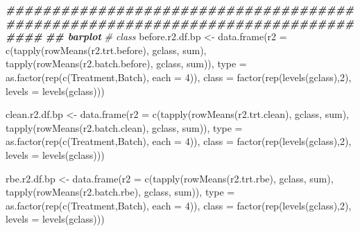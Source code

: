 \documentclass[
]{book}
\newenvironment{Shaded}{\begin{snugshade}}{\end{snugshade}}
\newcommand{\AttributeTok}[1]{\textcolor[rgb]{0.77,0.63,0.00}{#1}}
\newcommand{\CommentTok}[1]{\textcolor[rgb]{0.56,0.35,0.01}{\textit{#1}}}
\newcommand{\DecValTok}[1]{\textcolor[rgb]{0.00,0.00,0.81}{#1}}
\newcommand{\DocumentationTok}[1]{\textcolor[rgb]{0.56,0.35,0.01}{\textbf{\textit{#1}}}}
\newcommand{\FunctionTok}[1]{\textcolor[rgb]{0.00,0.00,0.00}{#1}}
\newcommand{\NormalTok}[1]{#1}
\newcommand{\OtherTok}[1]{\textcolor[rgb]{0.56,0.35,0.01}{#1}}
\newcommand{\StringTok}[1]{\textcolor[rgb]{0.31,0.60,0.02}{#1}}
\begin{document}
\begin{Shaded}
\begin{Highlighting}[]
\DocumentationTok{\#\#\#\#\#\#\#\#\#\#\#\#\#\#\#\#\#\#\#\#\#\#\#\#\#\#\#\#\#\#\#\#\#\#\#\#\#\#\#\#\#\#\#\#\#\#\#\#\#\#\#\#\#\#\#\#\#\#\#\#\#\#\#\#\#\#\#\#\#\#\#\#\#\#\#\#\#\#\#\#}
\DocumentationTok{\#\# barplot}
\CommentTok{\# class}
\NormalTok{before.r2.df.bp }\OtherTok{\textless{}{-}} 
  \FunctionTok{data.frame}\NormalTok{(}\AttributeTok{r2 =} \FunctionTok{c}\NormalTok{(}\FunctionTok{tapply}\NormalTok{(}\FunctionTok{rowMeans}\NormalTok{(r2.trt.before), gclass, sum), }
                    \FunctionTok{tapply}\NormalTok{(}\FunctionTok{rowMeans}\NormalTok{(r2.batch.before), gclass, sum)), }
             \AttributeTok{type =} \FunctionTok{as.factor}\NormalTok{(}\FunctionTok{rep}\NormalTok{(}\FunctionTok{c}\NormalTok{(}\StringTok{\textquotesingle{}Treatment\textquotesingle{}}\NormalTok{,}\StringTok{\textquotesingle{}Batch\textquotesingle{}}\NormalTok{), }\AttributeTok{each =} \DecValTok{4}\NormalTok{)),}
             \AttributeTok{class =} \FunctionTok{factor}\NormalTok{(}\FunctionTok{rep}\NormalTok{(}\FunctionTok{levels}\NormalTok{(gclass),}\DecValTok{2}\NormalTok{), }\AttributeTok{levels =} \FunctionTok{levels}\NormalTok{(gclass)))}

\NormalTok{clean.r2.df.bp }\OtherTok{\textless{}{-}} 
  \FunctionTok{data.frame}\NormalTok{(}\AttributeTok{r2 =} \FunctionTok{c}\NormalTok{(}\FunctionTok{tapply}\NormalTok{(}\FunctionTok{rowMeans}\NormalTok{(r2.trt.clean), gclass, sum), }
                    \FunctionTok{tapply}\NormalTok{(}\FunctionTok{rowMeans}\NormalTok{(r2.batch.clean), gclass, sum)), }
             \AttributeTok{type =} \FunctionTok{as.factor}\NormalTok{(}\FunctionTok{rep}\NormalTok{(}\FunctionTok{c}\NormalTok{(}\StringTok{\textquotesingle{}Treatment\textquotesingle{}}\NormalTok{,}\StringTok{\textquotesingle{}Batch\textquotesingle{}}\NormalTok{), }\AttributeTok{each =} \DecValTok{4}\NormalTok{)),}
             \AttributeTok{class =} \FunctionTok{factor}\NormalTok{(}\FunctionTok{rep}\NormalTok{(}\FunctionTok{levels}\NormalTok{(gclass),}\DecValTok{2}\NormalTok{), }\AttributeTok{levels =} \FunctionTok{levels}\NormalTok{(gclass)))}

\NormalTok{rbe.r2.df.bp }\OtherTok{\textless{}{-}} 
  \FunctionTok{data.frame}\NormalTok{(}\AttributeTok{r2 =} \FunctionTok{c}\NormalTok{(}\FunctionTok{tapply}\NormalTok{(}\FunctionTok{rowMeans}\NormalTok{(r2.trt.rbe), gclass, sum), }
                    \FunctionTok{tapply}\NormalTok{(}\FunctionTok{rowMeans}\NormalTok{(r2.batch.rbe), gclass, sum)), }
             \AttributeTok{type =} \FunctionTok{as.factor}\NormalTok{(}\FunctionTok{rep}\NormalTok{(}\FunctionTok{c}\NormalTok{(}\StringTok{\textquotesingle{}Treatment\textquotesingle{}}\NormalTok{,}\StringTok{\textquotesingle{}Batch\textquotesingle{}}\NormalTok{), }\AttributeTok{each =} \DecValTok{4}\NormalTok{)),}
             \AttributeTok{class =} \FunctionTok{factor}\NormalTok{(}\FunctionTok{rep}\NormalTok{(}\FunctionTok{levels}\NormalTok{(gclass),}\DecValTok{2}\NormalTok{), }\AttributeTok{levels =} \FunctionTok{levels}\NormalTok{(gclass)))}


\end{Highlighting}
\end{Shaded}
\end{document}
